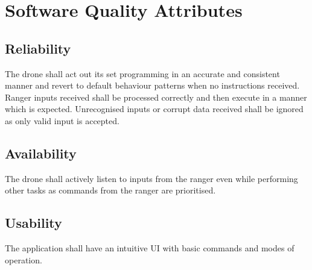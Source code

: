 \section{Software Quality Attributes}
\subsection {Reliability}
The drone shall act out its set programming in an accurate and consistent manner and revert to default behaviour patterns when no instructions received.  
\newline
Ranger inputs received shall be processed correctly and then execute in a manner which is expected. Unrecognised inputs or corrupt data received shall be ignored as only valid input is accepted.
\newline

\subsection{Availability}
The drone shall actively listen to inputs from the ranger even while performing other tasks as commands from the ranger are prioritised. 
\newline

\subsection{Usability}
The application shall have an intuitive UI with basic commands and modes of operation.
\newline

